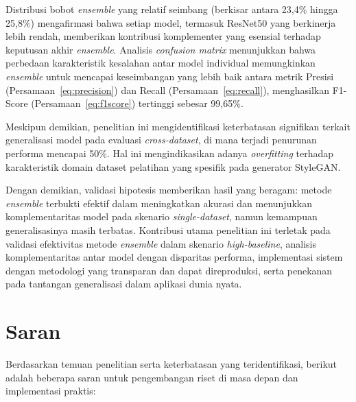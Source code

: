 Distribusi bobot \textit{ensemble} yang relatif seimbang (berkisar antara 23,4\% hingga 25,8\%) mengafirmasi bahwa setiap model, termasuk ResNet50 yang berkinerja lebih rendah, memberikan kontribusi komplementer yang esensial terhadap keputusan akhir \textit{ensemble}. Analisis \textit{confusion matrix} menunjukkan bahwa perbedaan karakteristik kesalahan antar model individual memungkinkan \textit{ensemble} untuk mencapai keseimbangan yang lebih baik antara metrik Presisi (Persamaan~\ref{eq:precision}) dan Recall (Persamaan~\ref{eq:recall}), menghasilkan F1-Score (Persamaan~\ref{eq:f1score}) tertinggi sebesar 99,65\%.

Meskipun demikian, penelitian ini mengidentifikasi keterbatasan signifikan terkait generalisasi model pada evaluasi \textit{cross-dataset}, di mana terjadi penurunan performa mencapai 50\%. Hal ini mengindikasikan adanya \textit{overfitting} terhadap karakteristik domain dataset pelatihan yang spesifik pada generator StyleGAN.

Dengan demikian, validasi hipotesis memberikan hasil yang beragam: metode \textit{ensemble} terbukti efektif dalam meningkatkan akurasi dan menunjukkan komplementaritas model pada skenario \textit{single-dataset}, namun kemampuan generalisasinya masih terbatas. Kontribusi utama penelitian ini terletak pada validasi efektivitas metode \textit{ensemble} dalam skenario \textit{high-baseline}, analisis komplementaritas antar model dengan disparitas performa, implementasi sistem dengan metodologi yang transparan dan dapat direproduksi, serta penekanan pada tantangan generalisasi dalam aplikasi dunia nyata.

\section{Saran}

Berdasarkan temuan penelitian serta keterbatasan yang teridentifikasi, berikut adalah beberapa saran untuk pengembangan riset di masa depan dan implementasi praktis:

